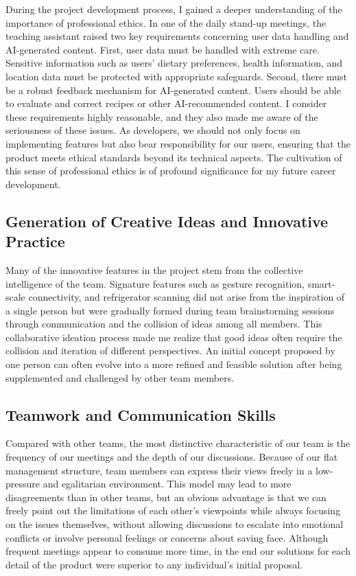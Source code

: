 \documentclass[sigconf]{acmart}
\begin{document}
During the project development process, I gained a deeper understanding of the importance of professional ethics. In one of the daily stand-up meetings, the teaching assistant raised two key requirements concerning user data handling and AI-generated content. First, user data must be handled with extreme care. Sensitive information such as users' dietary preferences, health information, and location data must be protected with appropriate safeguards. Second, there must be a robust feedback mechanism for AI-generated content. Users should be able to evaluate and correct recipes or other AI-recommended content. I consider these requirements highly reasonable, and they also made me aware of the seriousness of these issues. As developers, we should not only focus on implementing features but also bear responsibility for our users, ensuring that the product meets ethical standards beyond its technical aspects. The cultivation of this sense of professional ethics is of profound significance for my future career development.

\subsection{Generation of Creative Ideas and Innovative Practice}

Many of the innovative features in the project stem from the collective intelligence of the team. Signature features such as gesture recognition, smart-scale connectivity, and refrigerator scanning did not arise from the inspiration of a single person but were gradually formed during team brainstorming sessions through communication and the collision of ideas among all members. This collaborative ideation process made me realize that good ideas often require the collision and iteration of different perspectives. An initial concept proposed by one person can often evolve into a more refined and feasible solution after being supplemented and challenged by other team members.

\subsection{Teamwork and Communication Skills}

Compared with other teams, the most distinctive characteristic of our team is the frequency of our meetings and the depth of our discussions. Because of our flat management structure, team members can express their views freely in a low-pressure and egalitarian environment. This model may lead to more disagreements than in other teams, but an obvious advantage is that we can freely point out the limitations of each other's viewpoints while always focusing on the issues themselves, without allowing discussions to escalate into emotional conflicts or involve personal feelings or concerns about saving face. Although frequent meetings appear to consume more time, in the end our solutions for each detail of the product were superior to any individual's initial proposal.
\end{document}
